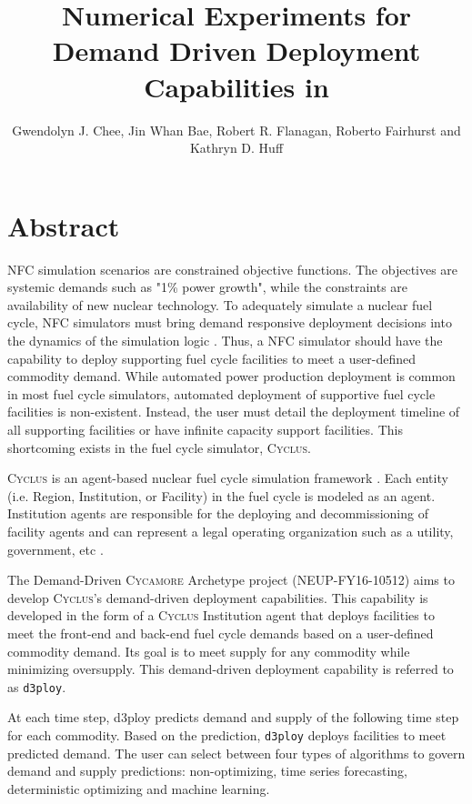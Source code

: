 \documentclass{anstrans}
\title{Numerical Experiments for Demand Driven Deployment Capabilities in \Cyclus}
\author{Gwendolyn J. Chee, Jin Whan Bae, Robert R. Flanagan, Roberto Fairhurst and Kathryn D. Huff}
\institute{
Dept. of Nuclear, Plasma and Radiological Engineering, University of Illinois at Urbana-Champaign \\
gchee2@illinois.edu
}
\newcommand{\Cyclus}{\textsc{Cyclus}\xspace}%
\newcommand{\Cycamore}{\textsc{Cycamore}\xspace}%
\begin{document}
\section{Abstract}
\gls{NFC} simulation scenarios are constrained objective functions. 
The objectives are systemic demands such as "1\% power growth", while the 
constraints are availability of new nuclear technology. 
To adequately simulate a nuclear fuel cycle, \gls{NFC} simulators 
must bring demand responsive deployment decisions into the dynamics of the 
simulation logic \cite{huff_current_2017}. 
Thus, a \gls{NFC} simulator should have the capability to deploy 
supporting fuel cycle facilities to meet a user-defined commodity demand. 
While automated power production deployment is common in most fuel cycle 
simulators, automated deployment of supportive fuel cycle 
facilities is non-existent. 
Instead, the user must detail the deployment timeline of all supporting 
facilities or have infinite capacity support facilities. This shortcoming 
exists in the fuel cycle simulator, \Cyclus. 

\Cyclus is an agent-based nuclear fuel cycle simulation framework 
\cite{huff_fundamental_2016}. 
Each entity (i.e. Region, Institution, or Facility) in the fuel cycle is modeled 
as an agent. 
Institution agents
are responsible for the deploying and decommissioning of facility agents and
can represent a legal operating organization such as a 
utility, government, etc \cite{huff_fundamental_2016}. 

The Demand-Driven \Cycamore Archetype project (NEUP-FY16-10512) aims to 
develop \Cyclus's demand-driven deployment capabilities. 
This capability is developed in the form of a \Cyclus Institution agent that 
deploys facilities to meet the front-end and back-end fuel cycle demands
based on a user-defined commodity demand. 
Its goal is to meet supply for any commodity while minimizing oversupply.
This demand-driven deployment capability is referred to as \texttt{d3ploy}. 

At each time step, d3ploy predicts demand and supply of the following time step 
for each commodity.
Based on the prediction, \texttt{d3ploy} deploys facilities to 
meet predicted demand. 
The user can select between four types of algorithms to govern demand and supply 
predictions: 
non-optimizing, time series forecasting, deterministic optimizing and machine 
learning. 
\end{document}
